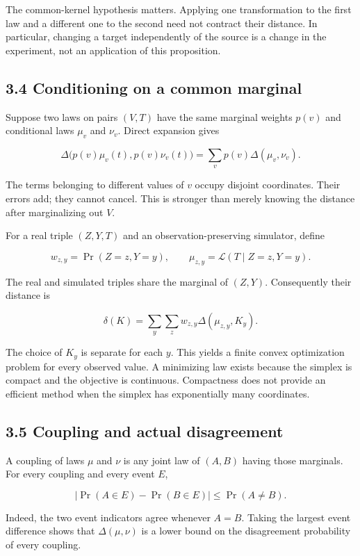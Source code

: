 \documentclass[
]{article}
\begin{document}
The common-kernel hypothesis matters. Applying one transformation to the
first law and a different one to the second need not contract their
distance. In particular, changing a target independently of the source
is a change in the experiment, not an application of this proposition.

\subsection{3.4 Conditioning on a common
marginal}\label{conditioning-on-a-common-marginal}

Suppose two laws on pairs \((V,T)\) have the same marginal weights
\(p(v)\) and conditional laws \(\mu_v\) and \(\nu_v\). Direct expansion
gives

\[
\Delta\bigl(p(v)\mu_v(t),p(v)\nu_v(t)\bigr)
=\sum_vp(v)\Delta(\mu_v,\nu_v).
\]

The terms belonging to different values of \(v\) occupy disjoint
coordinates. Their errors add; they cannot cancel. This is stronger than
merely knowing the distance after marginalizing out \(V\).

For a real triple \((Z,Y,T)\) and an observation-preserving simulator,
define

\[
w_{z,y}=\Pr(Z=z,Y=y),\qquad
\mu_{z,y}=\mathcal L(T\mid Z=z,Y=y).
\]

The real and simulated triples share the marginal of \((Z,Y)\).
Consequently their distance is

\[
\delta(K)=\sum_y\sum_z w_{z,y}\Delta(\mu_{z,y},K_y).
\]

The choice of \(K_y\) is separate for each \(y\). This yields a finite
convex optimization problem for every observed value. A minimizing law
exists because the simplex is compact and the objective is continuous.
Compactness does not provide an efficient method when the simplex has
exponentially many coordinates.

\subsection{3.5 Coupling and actual
disagreement}\label{coupling-and-actual-disagreement}

A coupling of laws \(\mu\) and \(\nu\) is any joint law of \((A,B)\)
having those marginals. For every coupling and every event \(E\),

\[
|\Pr(A\in E)-\Pr(B\in E)|\le\Pr(A\ne B).
\]

Indeed, the two event indicators agree whenever \(A=B\). Taking the
largest event difference shows that \(\Delta(\mu,\nu)\) is a lower bound
on the disagreement probability of every coupling.
\end{document}
